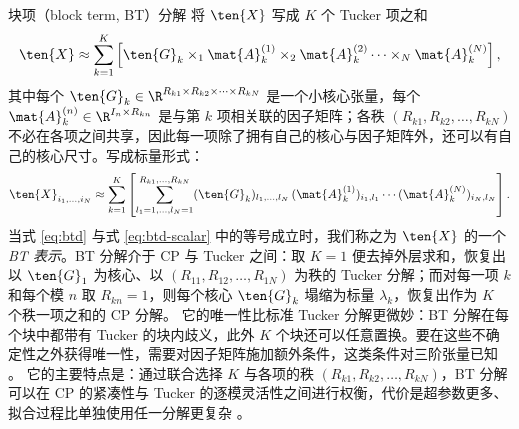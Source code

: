
块项（block term, BT）分解 \cite{lathauwer2008btd} 将 $\ten{X}$ 写成 $K$ 个 Tucker 项之和
\begin{equation}
\label{eq:btd}
\ten{X} \approx \sum_{k=1}^{K} \left[ \ten{G}_k\times_1\mat{A}_k^{(1)}\times_2\mat{A}_k^{(2)}\cdots\times_N\mat{A}_k^{(N)} \right],
\end{equation}
其中每个 $\ten{G}_k\in\R^{R_{k1}\times R_{k2}\times \cdots\times R_{kN}}$ 是一个小核心张量，每个 $\mat{A}_k^{(n)}\in\R^{I_{n}\times R_{kn}}$ 是与第 $k$ 项相关联的因子矩阵；各秩 $(R_{k1},R_{k2},\ldots,R_{kN})$ 不必在各项之间共享，因此每一项除了拥有自己的核心与因子矩阵外，还可以有自己的核心尺寸。写成标量形式：
\begin{equation}
\label{eq:btd-scalar}
\ten{X}_{i_1, \dots, i_N} \approx \sum_{k=1}^{K} \left[ \sum_{l_1=1, \dots, l_N=1}^{R_{k1}, \ldots, R_{kN}} (\ten{G}_k)_{l_1, \dots, l_N}\,(\mat{A}_k^{(1)})_{i_1,l_1}\cdots(\mat{A}_k^{(N)})_{i_N,l_N} \right].
\end{equation}
当式 \eqref{eq:btd} 与式 \eqref{eq:btd-scalar} 中的等号成立时，我们称之为 $\ten{X}$ 的一个 \emph{BT 表示}。BT 分解介于 CP 与 Tucker 之间：取 $K=1$ 便去掉外层求和，恢复出以 $\ten{G}_1$ 为核心、以 $(R_{11},R_{12},\ldots,R_{1N})$ 为秩的 Tucker 分解；而对每一项 $k$ 和每个模 $n$ 取 $R_{kn}=1$，则每个核心 $\ten{G}_k$ 塌缩为标量 $\lambda_k$，恢复出作为 $K$ 个秩一项之和的 CP 分解。
它的唯一性比标准 Tucker 分解更微妙：BT 分解在每个块中都带有 Tucker 的块内歧义，此外 $K$ 个块还可以任意置换。要在这些不确定性之外获得唯一性，需要对因子矩阵施加额外条件，这类条件对三阶张量已知 \cite{lathauwer2008btd}。
它的主要特点是：通过联合选择 $K$ 与各项的秩 $(R_{k1},R_{k2},\ldots,R_{kN})$，BT 分解可以在 CP 的紧凑性与 Tucker 的逐模灵活性之间进行权衡，代价是超参数更多、拟合过程比单独使用任一分解更复杂 \cite{lathauwer2008btd}。

\color{black}

